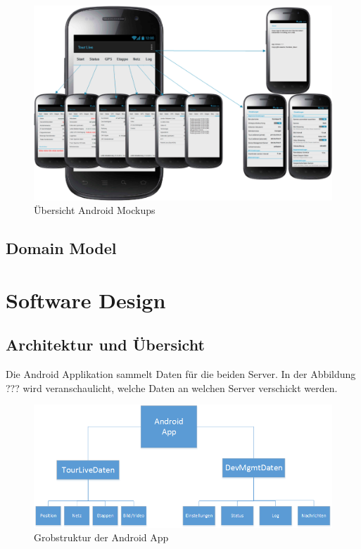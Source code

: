 \begin{figure}[H]
	\centering
	\includegraphics[width=150mm]{images/android/OverviewAndroid.png}
	\caption{Übersicht Android Mockups}
\end{figure}

\subsection{Domain Model}


\section{Software Design}
\subsection{Architektur und Übersicht}
Die Android Applikation sammelt Daten für die beiden Server. In der Abbildung ??? %
 wird veranschaulicht, welche Daten an welchen Server verschickt werden.

\begin{figure}[H]
	\centering
	\includegraphics[width=120mm]{images/android/uebersicht.png}
	\caption{Grobstruktur der Android App}
\end{figure}


